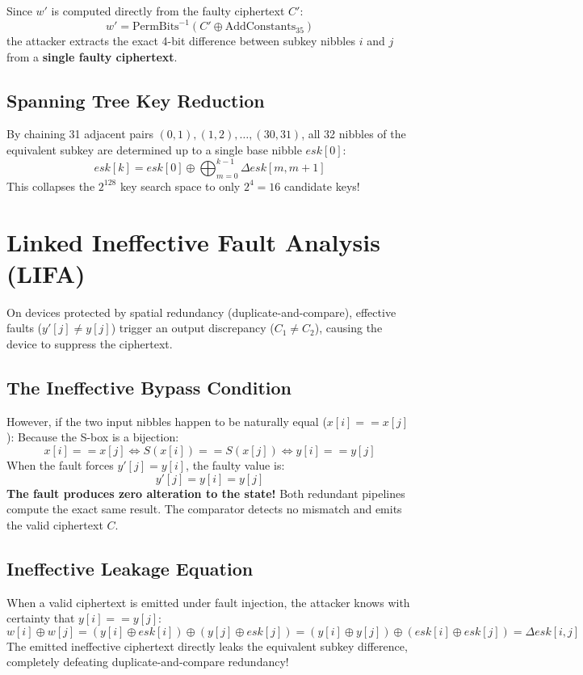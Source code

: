 Since $w'$ is computed directly from the faulty ciphertext $C'$:
\begin{equation}
    w' = \text{PermBits}^{-1}(C' \oplus \text{AddConstants}_{35})
\end{equation}
the attacker extracts the exact 4-bit difference between subkey nibbles $i$ and $j$ from a \textbf{single faulty ciphertext}.

\subsection{Spanning Tree Key Reduction}
By chaining 31 adjacent pairs $(0, 1), (1, 2), \dots, (30, 31)$, all 32 nibbles of the equivalent subkey are determined up to a single base nibble $esk[0]$:
\begin{equation}
    esk[k] = esk[0] \oplus \bigoplus_{m=0}^{k-1} \Delta esk[m, m+1]
\end{equation}
This collapses the $2^{128}$ key search space to only $2^4 = 16$ candidate keys!

\section{Linked Ineffective Fault Analysis (LIFA)}
\label{sec:lifa_math}
On devices protected by spatial redundancy (duplicate-and-compare), effective faults ($y'[j] \neq y[j]$) trigger an output discrepancy ($C_1 \neq C_2$), causing the device to suppress the ciphertext.

\subsection{The Ineffective Bypass Condition}
However, if the two input nibbles happen to be naturally equal ($x[i] == x[j]$):
Because the S-box is a bijection:
\begin{equation}
    x[i] == x[j] \iff S(x[i]) == S(x[j]) \iff y[i] == y[j]
\end{equation}
When the fault forces $y'[j] = y[i]$, the faulty value is:
\begin{equation}
    y'[j] = y[i] = y[j]
\end{equation}
\textbf{The fault produces zero alteration to the state!} Both redundant pipelines compute the exact same result. The comparator detects no mismatch and emits the valid ciphertext $C$.

\subsection{Ineffective Leakage Equation}
When a valid ciphertext is emitted under fault injection, the attacker knows with certainty that $y[i] == y[j]$:
\begin{equation}
    w[i] \oplus w[j] = (y[i] \oplus esk[i]) \oplus (y[j] \oplus esk[j]) = (y[i] \oplus y[j]) \oplus (esk[i] \oplus esk[j]) = \Delta esk[i, j]
\end{equation}
The emitted ineffective ciphertext directly leaks the equivalent subkey difference, completely defeating duplicate-and-compare redundancy!


